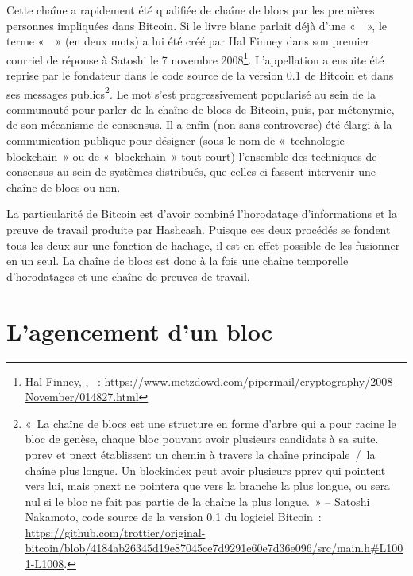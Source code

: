 Cette chaîne a rapidement été qualifiée de chaîne de blocs par les premières personnes impliquées dans Bitcoin. Si le livre blanc parlait déjà d'une «~~», le terme «~~» (en deux mots) a lui été créé par Hal Finney dans son premier courriel de réponse à Satoshi le 7 novembre 2008\footnote{Hal Finney, , ~: \url{https://www.metzdowd.com/pipermail/cryptography/2008-November/014827.html}}. L'appellation a ensuite été reprise par le fondateur dans le code source de la version 0.1 de Bitcoin et dans ses messages publics\footnote{«~La chaîne de blocs est une structure en forme d'arbre qui a pour racine le bloc de genèse, chaque bloc pouvant avoir plusieurs candidats à sa suite. pprev et pnext établissent un chemin à travers la chaîne principale~/~la chaîne plus longue. Un blockindex peut avoir plusieurs pprev qui pointent vers lui, mais pnext ne pointera que vers la branche la plus longue, ou sera nul si le bloc ne fait pas partie de la chaîne la plus longue.~» -- Satoshi Nakamoto, code source de la version 0.1 du logiciel Bitcoin~: \url{https://github.com/trottier/original-bitcoin/blob/4184ab26345d19e87045ce7d9291e60e7d36e096/src/main.h\#L1001-L1008}.}. Le mot  s'est progressivement popularisé au sein de la communauté pour parler de la chaîne de blocs de Bitcoin, puis, par métonymie, de son mécanisme de consensus. Il a enfin (non sans controverse) été élargi à la communication publique pour désigner (sous le nom de «~technologie blockchain~» ou de «~blockchain~» tout court) l'ensemble des techniques de consensus au sein de systèmes distribués, que celles-ci fassent intervenir une chaîne de blocs ou non.

La particularité de Bitcoin est d'avoir combiné l'horodatage d'informations et la preuve de travail produite par Hashcash. Puisque ces deux procédés se fondent tous les deux sur une fonction de hachage, il est en effet possible de les fusionner en un seul. La chaîne de blocs est donc à la fois une chaîne temporelle d'horodatages et une chaîne de preuves de travail.

\vspace{-1em}
\section*{L'agencement d'un bloc} %


